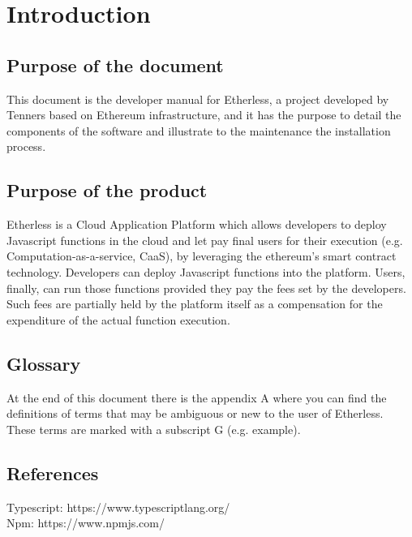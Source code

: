 \section{Introduction}

\subsection{Purpose of the document}
This document is the developer manual for Etherless, a project developed by Tenners based on Ethereum infrastructure, and it has the purpose to detail the components of the software and illustrate to the maintenance the installation process.

\subsection{Purpose of the product}
Etherless is a Cloud Application Platform which allows developers to deploy Javascript functions in the cloud and let pay final users for their execution (e.g. Computation-as-a-service, CaaS), by leveraging the ethereum's smart contract technology. Developers can deploy Javascript functions into the platform. Users, finally, can run those functions provided they pay the fees set by the developers. Such fees are partially held by the platform itself as a compensation for the expenditure of the actual function execution.

\subsection{Glossary}
At the end of this document there is the appendix A where you can find the definitions of terms that may be ambiguous or new to the user of Etherless. These terms are marked with a subscript G (e.g. example\glos).

\subsection{References}

Typescript: https://www.typescriptlang.org/\\
Npm: https://www.npmjs.com/\\